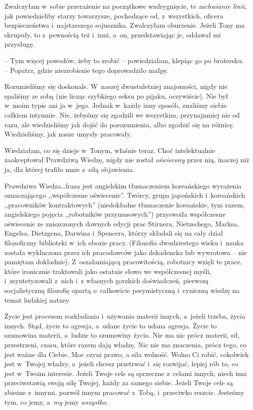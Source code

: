 \documentclass[oneside,polish,11pt,sfheadings]{mwbk}
\begin{document}
Zwalczyłam w~sobie przerażenie na początkowe wzdrygnięcie,
te \textit{zachwianie linii}, jak powiedzieliby starzy towarzysze,
pochodzące od, z~wszystkich, oficera bezpieczeństwa i~najstarszego
sojusznika. Zwalczyłam oburzenie. Jeżeli Tony ma skrupuły, to z~pewnością też i~inni, a~on, przedstawiając je, oddawał mi przysługę.

-- Tym więcej powodów, żeby to zrobić -- powiedziałam, klepiąc go po
bratersku. -- Popatrz, gdzie niezrobienie tego doprowadziło małpy.

Rozumieliśmy się doskonale. W~naszej dwustuletniej znajomości, nigdy nie
spaliśmy ze sobą (nie licząc szybkiego seksu po pijaku, oczywiście). Nie
był w~moim typie ani ja w~jego. Jednak w~każdy inny sposób, znaliśmy
siebie całkiem intymnie. Nie, żebyśmy się zgodzili we wszystkim,
przynajmniej nie od razu, ale wiedzieliśmy jak dojść do porozumienia,
albo zgodzić się na różnicę. Wiedzieliśmy, jak nasze umysły pracowały.

Wiedziałam, co się dzieje w~Tonym, właśnie teraz. Choć intelektualnie
zaakceptował Prawdziwą Wiedzę, nigdy nie został \textit{oświecony} przez
nią, inaczej niż ja, dla której trafiło mnie z~siłą objawienia.

Prawdziwa Wiedza\ldots  fraza jest angielskim tłumaczeniem koreańskiego
wyrażenia oznaczającego ,,współczesne oświecenie''. Twórcy, grupa
japońskich i~koreańskich ,,pracowników kontraktowych'' (niedokładne
tłumaczenie koreańskie, tym razem, angielskiego pojęcia ,,robotników
przymusowych'') przyswoiła współczesne oświecenie ze zniszczonych dawnych
edycji prac Stirnera, Nietzschego, Marksa, Engelsa, Dietzgena, Darwina i~Spencera, którzy składali się na cały dział filozoficzny biblioteki w~ich obozie pracy. (Filozofia dwudziestego wieku i~nauka została
wykluczona przez ich pracodawców jako dekadencka lub wywrotowa -- nie
pamiętam dokładnie). Z~oszałamiającą pracowitością, robotnicy wzięli te
prace, które ironicznie traktowali jako ostatnie słowo we współczesnej
myśli, i~zsyntetyzowali z~nich i~z własnych gorzkich doświadczeń,
pierwszą socjalistyczną filozofię opartą o~całkowicie pesymistyczną i~cyniczną wiedzę na temat ludzkiej natury.

Życie jest procesem rozkładania i~używania materii innych, a~jeżeli
trzeba, życia innych. Stąd, życie to agresja, a~udane życie to udana
agresja. Życie to szumowina materii, a~ludzie to szumowiny życia. Nie ma
nic prócz materii, sił, przestrzeni, czasu, które razem dają władzę. Nic
nie ma znaczenia, prócz tego, co jest ważne dla Ciebie. Moc czyni prawo,
a siła wolność. Wolno Ci robić, cokolwiek jest w~Twojej władzy, a~jeżeli
chcesz przetrwać i~się rozwijać, lepiej rób to, co jest w~Twoim
interesie. Jeżeli Twoje cele są sprzeczne z~celami innych, niech inni
przeciwstawią swoją siłę Twojej, każdy za samego siebie. Jeżeli Twoje
cele są zbieżne z~innymi, pozwól innym pracować z~Tobą, i~przeciwko
reszcie. Jesteśmy tym, co jemy, a~\textit{my} jemy \textit{wszystko}.
\end{document}

